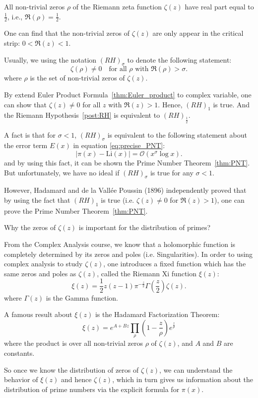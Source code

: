 \documentclass{elegantbook}
\begin{document}
\begin{postulate} \label{post:RH}
  All non-trivial zeros $\rho$ of the Riemann zeta function $\zeta(z)$ have real part equal to $\frac{1}{2}$, i.e., $\Re(\rho) = \frac{1}{2}$.
\end{postulate}

\begin{remark}
  One can find that the non-trivial zeros of $\zeta(z)$ are only appear in the critical strip: $0 < \Re(z) < 1$.
\end{remark}

\begin{definition}
  Usually, we using the notation $(RH)_\sigma$ to denote the following statement:
  \[
    \zeta(\rho)\ne0 \quad \text{for all } \rho \text{ with } \Re(\rho) > \sigma.
  \]
  where ${\rho}$ is the set of non-trivial zeros of $\zeta(z)$.
\end{definition}

By extend Euler Product Formula~\ref{thm:Euler_product} to complex variable, one can show that $\zeta(z)\ne0$ for all $z$ with $\Re(z) > 1$. Hence, $(RH)_1$ is true. And the Riemann Hypothesis~\ref{post:RH} is equivalent to $(RH)_{\frac{1}{2}}$.

A fact is that for $\sigma<1$, $(RH)_{\sigma}$ is equivalent to the following statement about the error term $E(x)$ in equation \eqref{eq:precise_PNT}:
\[
  |\pi(x)-\mathrm{Li}(x)|=\mathcal{O}(x^{\sigma}\log x).
\]
and by using this fact, it can be shown the Prime Number Theorem~\ref{thm:PNT}. But unfortunately, we have no ideal if $(RH)_{\sigma}$ is true for any $\sigma < 1$.

However, Hadamard and de la Vallée Poussin (1896) independently proved that by using the fact that $(RH)_1$ is true (i.e. $\zeta(z)\ne0$ for $\Re(z) > 1$), one can prove the Prime Number Theorem~\ref{thm:PNT}.

\begin{note}
  Why the zeros of $\zeta(z)$ is important for the distribution of primes? 

  From the Complex Analysis course, we know that a holomorphic function is completely determined by its zeros and poles (i.e. Singularities). In order to using complex analysis to study $\zeta(z)$, one introduces a fixed function which has the same zeros and poles as $\zeta(z)$, called the Riemann Xi function $\xi(z)$:
  \[
    \xi(z) = \frac{1}{2} z (z-1) \pi^{-\frac{z}{2}} \Gamma\left(\frac{z}{2}\right) \zeta(z).
  \]
  where $\Gamma(z)$ is the Gamma function.

  A famous result about $\xi(z)$ is the Hadamard Factorization Theorem:
  \[
    \xi(z) = e^{A + B z} \prod_{\rho} \left(1 - \frac{z}{\rho}\right) e^{\frac{z}{\rho}}
  \]
  where the product is over all non-trivial zeros $\rho$ of $\zeta(z)$, and $A$ and $B$ are constants.

  So once we know the distribution of zeros of $\zeta(z)$, we can understand the behavior of $\xi(z)$ and hence $\zeta(z)$, which in turn gives us information about the distribution of prime numbers via the explicit formula for $\pi(x)$.
\end{note}
\end{document}
